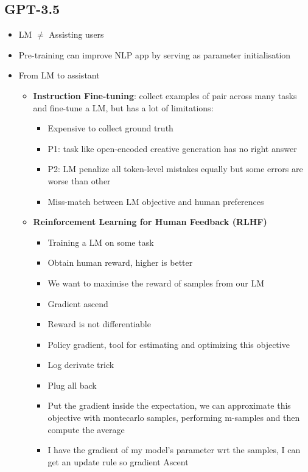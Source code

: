 \subsection{GPT-3.5}
\begin{itemize}
    \item LM \(\neq\) Assisting users
    \item Pre-training can improve NLP app by serving as parameter initialisation
    \item From LM to assistant
    \begin{itemize}
        \item \textbf{Instruction Fine-tuning}: collect examples of pair across many tasks and fine-tune a LM, but has a lot of limitations:
        \begin{itemize}
            \item Expensive to collect ground truth
            \item P1: task like open-encoded creative generation has no right answer
            \item P2: LM penalize all token-level mistakes equally but some errors are worse than other
            \item Miss-match between LM objective and human preferences
        \end{itemize}
        \item \textbf{Reinforcement Learning for Human Feedback (RLHF)}
        \begin{itemize}
            \item Training a LM on some task
            \item Obtain human reward, higher is better
            \item We want to maximise the reward of samples from our LM
            \item Gradient ascend
            \item Reward is not differentiable
            \item Policy gradient, tool for estimating and optimizing this objective
            \item Log derivate trick
            \item Plug all back
            \item Put the gradient inside the expectation, we can approximate this objective with montecarlo samples, performing m-samples and then compute the average
            \item I have the gradient of my model's parameter wrt the samples, I can get an update rule so gradient Ascent

\end{itemize}
\end{itemize}
\end{itemize}

